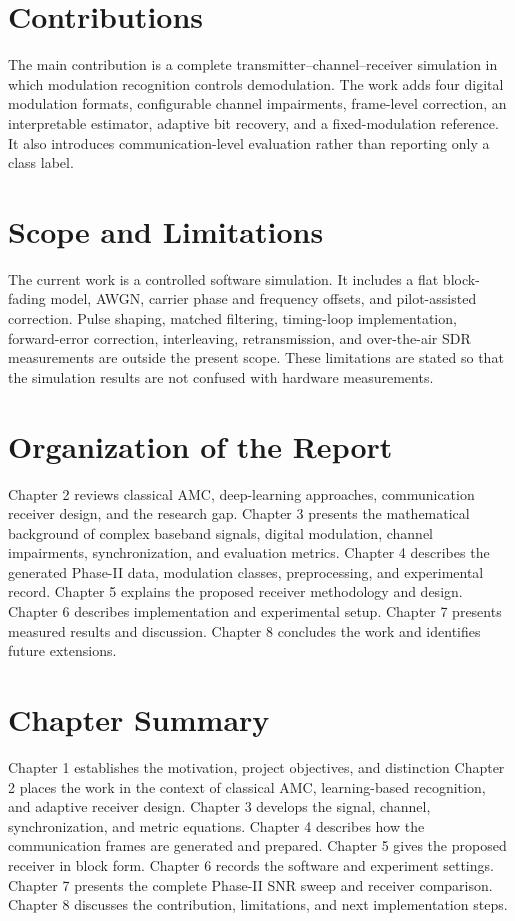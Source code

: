 \documentclass[12pt,twoside,openright]{report}
\begin{document}
\section{Contributions}
The main contribution is a complete transmitter--channel--receiver
simulation in which modulation recognition controls demodulation. The work
adds four digital modulation formats, configurable channel impairments,
frame-level correction, an interpretable estimator, adaptive bit recovery,
and a fixed-modulation reference. It also introduces communication-level
evaluation rather than reporting only a class label.

\section{Scope and Limitations}
The current work is a controlled software simulation. It includes a flat
block-fading model, AWGN, carrier phase and frequency offsets, and
pilot-assisted correction. Pulse shaping, matched filtering, timing-loop
implementation, forward-error correction, interleaving, retransmission, and
over-the-air SDR measurements are outside the present scope. These
limitations are stated so that the simulation results are not confused with
hardware measurements.

\section{Organization of the Report}
Chapter 2 reviews classical AMC, deep-learning approaches, communication
receiver design, and the research gap. Chapter 3 presents the mathematical
background of complex baseband signals, digital modulation, channel
impairments, synchronization, and evaluation metrics. Chapter 4 describes
the generated Phase-II data, modulation classes, preprocessing, and
experimental record. Chapter 5 explains the proposed receiver methodology
and design. Chapter 6 describes implementation and experimental setup.
Chapter 7 presents measured results and discussion. Chapter 8 concludes the
work and identifies future extensions.

\section{Chapter Summary}
Chapter 1 establishes the motivation, project objectives, and distinction
Chapter 2 places the work in the context of classical AMC, learning-based
recognition, and adaptive receiver design.
Chapter 3 develops the signal, channel, synchronization, and metric
equations. Chapter 4 describes how the communication frames are generated
and prepared. Chapter 5 gives the proposed receiver in block form.
Chapter 6 records the software and experiment settings. Chapter 7 presents
the complete Phase-II SNR sweep and receiver comparison. Chapter 8 discusses
the contribution, limitations, and next implementation steps.
\end{document}
